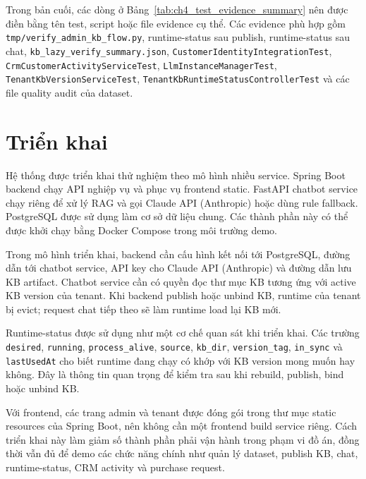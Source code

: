 \documentclass[../DoAn.tex]{subfiles}
\begin{document}
Trong bản cuối, các dòng ở Bảng~\ref{tab:ch4_test_evidence_summary} nên được điền bằng tên test, script hoặc file evidence cụ thể. Các evidence phù hợp gồm \texttt{tmp/verify\_admin\_kb\_flow.py}, runtime-status sau publish, runtime-status sau chat, \texttt{kb\_lazy\_verify\_summary.json}, \texttt{CustomerIdentityIntegrationTest}, \texttt{CrmCustomerActivityServiceTest}, \texttt{LlmInstanceManagerTest}, \texttt{TenantKbVersionServiceTest}, \texttt{TenantKbRuntimeStatusControllerTest} và các file quality audit của dataset.

\section{Triển khai}
\label{section:4.5}

Hệ thống được triển khai thử nghiệm theo mô hình nhiều service. Spring Boot backend chạy API nghiệp vụ và phục vụ frontend static. FastAPI chatbot service chạy riêng để xử lý RAG và gọi Claude API (Anthropic) hoặc dùng rule fallback. PostgreSQL được sử dụng làm cơ sở dữ liệu chung. Các thành phần này có thể được khởi chạy bằng Docker Compose trong môi trường demo.

Trong mô hình triển khai, backend cần cấu hình kết nối tới PostgreSQL, đường dẫn tới chatbot service, API key cho Claude API (Anthropic) và đường dẫn lưu KB artifact. Chatbot service cần có quyền đọc thư mục KB tương ứng với active KB version của tenant. Khi backend publish hoặc unbind KB, runtime của tenant bị evict; request chat tiếp theo sẽ làm runtime load lại KB mới.

Runtime-status được sử dụng như một cơ chế quan sát khi triển khai. Các trường \texttt{desired}, \texttt{running}, \texttt{process\_alive}, \texttt{source}, \texttt{kb\_dir}, \texttt{version\_tag}, \texttt{in\_sync} và \texttt{lastUsedAt} cho biết runtime đang chạy có khớp với KB version mong muốn hay không. Đây là thông tin quan trọng để kiểm tra sau khi rebuild, publish, bind hoặc unbind KB.

Với frontend, các trang admin và tenant được đóng gói trong thư mục static resources của Spring Boot, nên không cần một frontend build service riêng. Cách triển khai này làm giảm số thành phần phải vận hành trong phạm vi đồ án, đồng thời vẫn đủ để demo các chức năng chính như quản lý dataset, publish KB, chat, runtime-status, CRM activity và purchase request.
\end{document}
